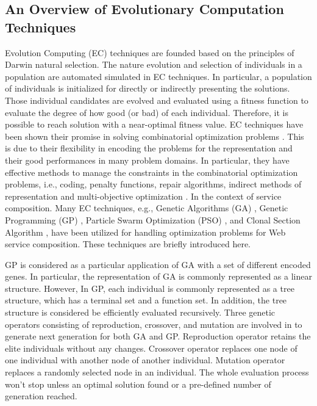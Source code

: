 \subsection{An Overview of Evolutionary Computation Techniques}\label{ec}

Evolution Computing (EC) techniques are founded based on the principles of Darwin natural selection. The nature evolution and selection of individuals in a population are automated simulated in EC techniques. In particular, a population of individuals is initialized for directly or indirectly presenting the solutions. Those individual candidates are evolved and evaluated using a fitness function to evaluate the degree of how good (or bad) of each individual. Therefore, it is possible to reach solution with a near-optimal fitness value. EC techniques have been shown their promise in solving combinatorial optimization problems \cite{back1997evolutionary}. This is due to their flexibility in encoding the problems for the representation and their good performances in many problem domains. In particular, they have effective methods to manage the constraints in the combinatorial optimization problems, i.e., coding, penalty functions, repair algorithms, indirect methods of representation and multi-objective optimization \cite{fleming2002evolutionary}. In the context of service composition. Many EC techniques, e.g., Genetic Algorithms (GA) \cite{whitley1994genetic}, Genetic Programming (GP) \cite{koza1992genetic}, Particle Swarm Optimization (PSO) \cite{kennedy1995particle}, and Clonal Section Algorithm \cite{de2002learning}, have been utilized for handling optimization problems for Web service composition. These techniques are briefly introduced here.

GP is considered as a particular application of GA with a set of different encoded genes. In particular, the representation of GA is commonly represented as a linear structure. However, In GP, each individual is commonly represented as a tree structure, which has a terminal set and a function set. In addition, the tree structure is considered be efficiently evaluated recursively. Three genetic operators consisting of reproduction, crossover, and mutation are involved in to generate next generation for both GA and GP. Reproduction operator retains the elite individuals without any changes. Crossover operator replaces one node of one individual with another node of another individual. Mutation operator replaces a randomly selected node in an individual. The whole evaluation process won't stop unless an optimal solution found or a pre-defined number of generation reached.

